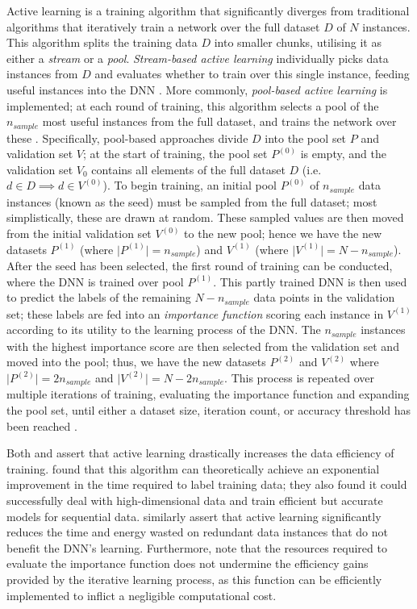 \documentclass[a4paper, 11pt]{report}
\begin{document}
    Active learning is a training algorithm that significantly diverges from traditional algorithms that iteratively train a network over the full dataset $D$ of $N$ instances. This algorithm splits the training data $D$ into smaller chunks, utilising it as either a \emph{stream} or a \emph{pool}. \emph{Stream-based active learning} individually picks data instances from $D$ and evaluates whether to train over this single instance, feeding useful instances into the DNN \citep{ren-2021}. More commonly, \emph{pool-based active learning} is implemented; at each round of training, this algorithm selects a pool of the $n_{sample}$ most useful instances from the full dataset, and trains the network over these \citep{ren-2021}. Specifically, pool-based approaches divide $D$ into the pool set $P$ and validation set $V$; at the start of training, the pool set $P^{(0)}$ is empty, and the validation set $V_0$ contains all elements of the full dataset $D$ (i.e. $d \in D \implies d \in V^{(0)}$). To begin training, an initial pool $P^{(0)}$ of $n_{sample}$ data instances (known as the seed) must be sampled from the full dataset; most simplistically, these are drawn at random. These sampled values are then moved from the initial validation set $V^{(0)}$ to the new pool; hence we have the new datasets $P^{(1)}$ (where $\vert P^{(1)} \vert = n_{sample}$) and $V^{(1)}$ (where $\vert V^{(1)} \vert = N - n_{sample}$). After the seed has been selected, the first round of training can be conducted, where the DNN is trained over pool $P^{(1)}$. This partly trained DNN is then used to predict the labels of the remaining $N - n_{sample}$ data points in the validation set; these labels are fed into an \emph{importance function} scoring each instance in $V^{(1)}$ according to its utility to the learning process of the DNN. The $n_{sample}$ instances with the highest importance score are then selected from the validation set and moved into the pool; thus, we have the new datasets $P^{(2)}$ and $V^{(2)}$ where $\vert P^{(2)} \vert = 2 n_{sample}$ and $\vert V^{(2)} \vert = N - 2 n_{sample}$. This process is repeated over multiple iterations of training, evaluating the importance function and expanding the pool set, until either a dataset size, iteration count, or accuracy threshold has been reached \citep{ren-2021}.

    Both \citet{ren-2021} and \citet{xu-2021} assert that active learning drastically increases the data efficiency of training. \citet{ren-2021} found that this algorithm can theoretically achieve an exponential improvement in the time required to label training data; they also found it could successfully deal with high-dimensional data and train efficient but accurate models for sequential data. \citet{xu-2021} similarly assert that active learning significantly reduces the time and energy wasted on redundant data instances that do not benefit the DNN's learning. Furthermore, \citet{ren-2021} note that the resources required to evaluate the importance function does not undermine the efficiency gains provided by the iterative learning process, as this function can be efficiently implemented to inflict a negligible computational cost. 
\end{document}
